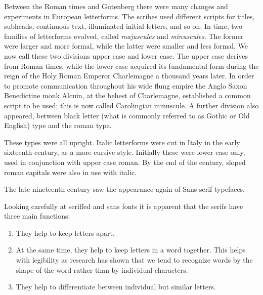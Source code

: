 \documentclass[10pt,letterpaper,extrafontsizes]{memoir}
\begin{document}
    Between the Roman times and Gutenberg there were many changes and
experiments in European letterforms. The scribes used different scripts
for titles, subheads, continuous text, illuminated initial letters, and so
on. In time, two families of letterforms evolved, 
called \emph{majuscules} and \emph{minuscules}. 
The former were larger and more formal, while the latter
were smaller and less formal. We now call these two divisions upper case and
lower case. The upper case derives from Roman times, while the lower case
acquired its fundamental form during the reign of the Holy Roman Emperor
Charlemagne a thousand years later. In order to 
promote communication
throughout his wide flung empire the Anglo Saxon Benedictine monk 
Alcuin, at the behest of Charlemagne, established a common
script to be used; this is now called Carolingian 
minuscule.
A further division also appeared, between black letter (what is
commonly referred to as Gothic or Old English) type and the roman type.

    These types were all upright. Italic letterforms were 
cut in Italy
in the early sixteenth century, as a more cursive style. Initially these were
lower case only, used in conjunction with upper case roman. By the end of
the century, sloped roman capitals were also in use with italic.

    The late nineteenth century saw the appearance again of 
Sans-serif
typefaces.

    Looking carefully at seriffed and sans fonts it is apparent that
the serifs have three main functions:
\begin{enumerate}
\item They help to keep letters apart.
\item At the same time, they help to keep letters in a word together. This
  helps with legibility as research has shown that 
  we tend to recognize
  words by the shape of the word rather than by individual characters.
\item They help to differentiate between individual but similar letters.
\end{enumerate}
\end{document}
